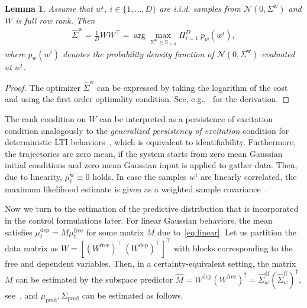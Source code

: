 \documentclass[letterpaper, 10 pt, conference]{ieeeconf}
\def\Wd{W}
\def\mp{\mu_\mathrm{pred}}
\def\mw{\mu^\mathrm{w}_t}
\def\mdep{\mu^\mathrm{dep}_t}
\def\mfree{\mu^\mathrm{free}_t}
\def\Sw{\Sigma^\mathrm{w}}
\def\Swh{\hat{\Sigma}^\mathrm{w}}
\def\Sp{\Sigma_\mathrm{pred}}
\newtheorem{lemma}{Lemma}
\begin{document}
\begin{lemma} \label{lemma:MLE}
    Assume that $w^i,~i\in\{1,\dots,D\}$ are i.i.d. samples from $\mathcal{N}(0,\Sw)$ and $W$ is full row rank. Then
    \begin{align*}
        \Swh =\frac{1}{D} \Wd\Wd^\top=\arg \max_{\Sw\in\mathbb{S}_{>0}} \Pi_{i=1}^{D}~p_w(w^i),
    \end{align*}
    where $p_w(w^i)$ denotes the probability density function of $\mathcal{N}(0,\Sw)$ evaluated at $w^i$.
\end{lemma}
\begin{proof}
The optimizer $\Swh$ can be expressed by taking the logarithm of the cost and using the first order optimality condition.
See, e.g.,~\cite[Thm. 3.1.5]{muirhead1982aspects} for the derivation.
\end{proof}

The rank condition on $\Wd$ can be interpreted as a persistence of excitation condition analogously to the \textit{generalized persistency of excitation} condition for deterministic \gls{LTI} behaviors~\cite{markovsky2022data}, which is equivalent to identifiability.
Furthermore, the trajectories are zero mean, if the system starts from zero mean Gaussian initial conditions and zero mean Gaussian input is applied to gather data. Then, due to linearity, $\mw \equiv 0$ holds.
In case the samples $w^i$ are linearly correlated, the maximum likelihood estimate is given as a weighted sample covariance~\cite{burda2011applying,zhang2019covariance}.


Now we turn to the estimation of the predictive distribution that is incorporated in the control formulations later.
For linear Gaussian behaviors, the mean satisfies $\mdep = M\mfree$ for some matrix $M$ due to~\eqref{eq:linear}.
Let us partition the data matrix as $W=[(W^\mathrm{free})^\top~(W^\mathrm{dep})^\top]^\top$ with blocks corresponding to the free and dependent variables.
Then, in a certainty-equivalent setting, the matrix $M$ can be estimated by the subspace predictor $\hat{M} = W^\mathrm{dep}(W^\mathrm{free})^\dagger = \hat{\Sigma}^\mathrm{df}_w (\hat{\Sigma}^\mathrm{ff}_w)^\dagger$, see~\cite{favoreel1999spc,dorfler2022bridging}, and $\mp,\Sp$ can be estimated as follows.
\end{document}
